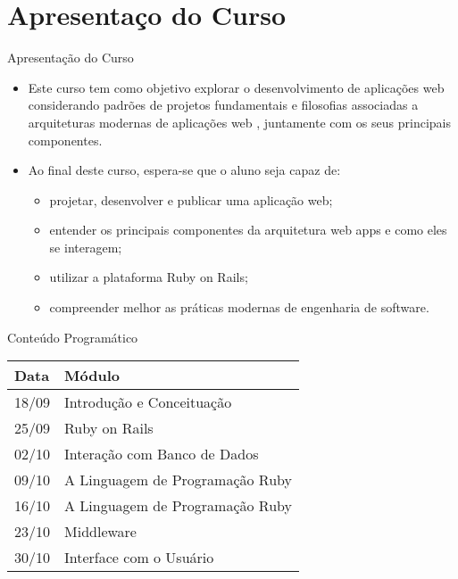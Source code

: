 \section{Apresentaço do Curso}

\begin{frame}[fragile,t]{Apresentação do Curso}
  \begin{itemize}
    \item Este curso tem como objetivo explorar o \alert{desenvolvimento de aplicações web} considerando 
      \alert{padrões de projetos} fundamentais e filosofias associadas a \alert{arquiteturas modernas} de aplicações web
      , juntamente com os seus principais componentes.
    \item Ao final deste curso, espera-se que o aluno seja capaz de:
    \begin{itemize}
      \item projetar, desenvolver e publicar uma aplicação web;
      \item entender os principais \alert{componentes} da arquitetura web apps e como eles se interagem;
      \item utilizar a plataforma Ruby on Rails;
      \item compreender melhor as \alert{práticas} modernas de engenharia de software.
    \end{itemize}
  \end{itemize}
\end{frame}
\begin{frame}[fragile,t]{Conteúdo Programático}
    \begin{center}
      \begin{tabular}{| p{2cm} | p{8cm} |}
	\hline
	\textbf{Data} & \textbf{Módulo} \\ \hline
	18/09 & Introdução e Conceituação \\ \hline
	25/09 & Ruby on Rails \\ \hline
	02/10 & Interação com Banco de Dados \\ \hline
	09/10 & A Linguagem de Programação Ruby \\ \hline
	16/10 & A Linguagem de Programação Ruby \\ \hline
	23/10 & Middleware \\ \hline
	30/10 & Interface com o Usuário \\ \hline
	\hline
      \end{tabular}
    \end{center}  
\end{frame}